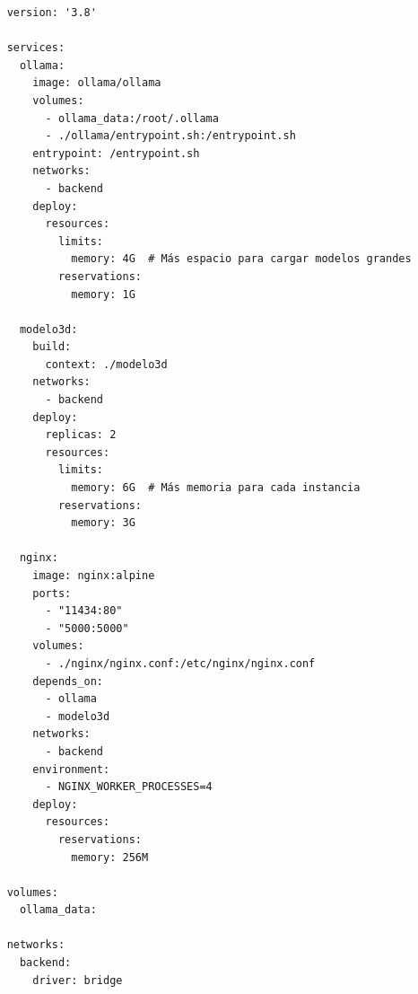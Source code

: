 \captionsetup{type=listing}
\label{lst:composeServidor}
\begin{verbatim}
    version: '3.8'
    
    services:
      ollama:
        image: ollama/ollama
        volumes:
          - ollama_data:/root/.ollama
          - ./ollama/entrypoint.sh:/entrypoint.sh
        entrypoint: /entrypoint.sh
        networks:
          - backend
        deploy:
          resources:
            limits:
              memory: 4G  # Más espacio para cargar modelos grandes
            reservations:
              memory: 1G
    
      modelo3d:
        build:
          context: ./modelo3d
        networks:
          - backend
        deploy:
          replicas: 2
          resources:
            limits:
              memory: 6G  # Más memoria para cada instancia
            reservations:
              memory: 3G
    
      nginx:
        image: nginx:alpine
        ports:
          - "11434:80"
          - "5000:5000"
        volumes:
          - ./nginx/nginx.conf:/etc/nginx/nginx.conf
        depends_on:
          - ollama
          - modelo3d
        networks:
          - backend
        environment:
          - NGINX_WORKER_PROCESSES=4
        deploy:
          resources:
            reservations:
              memory: 256M
    
    volumes:
      ollama_data:
    
    networks:
      backend:
        driver: bridge
\end{verbatim}

